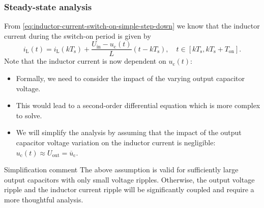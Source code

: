 \begin{frame}
    \frametitle{Steady-state analysis}
    From \eqref{eq:inductor-current-switch-on-simple-step-down} we know that the inductor current during the switch-on period is given by
    \begin{equation*}
        i_\mathrm{L}(t) = i_\mathrm{L}(k T_\mathrm{s}) + \frac{U_\mathrm{in}-u_\mathrm{c}(t)}{L} (t - k T_\mathrm{s}), \quad t\in [k T_\mathrm{s}, k T_\mathrm{s} + T_\mathrm{on}]. 
    \end{equation*}
   Note that the inductor current is now dependent on $u_\mathrm{c}(t)$:
    \begin{itemize}
        \item Formally, we need to consider the impact of the varying output capacitor voltage.
        \item This would lead to a second-order differential equation which is more complex to solve.
        \item We will simplify the analysis by assuming that the impact of the output capacitor voltage variation on the inductor current is negligible: $u_\mathrm{c}(t) \approx U_\mathrm{out}=\overline{u}_\mathrm{c}$.
    \end{itemize} 
    \vspace{-0.5cm}
    \begin{varblock}{Simplification comment}
        The above assumption is valid for sufficiently large output capacitors with only small voltage ripples. Otherwise, the output voltage ripple and the inductor current ripple will be significantly coupled and require a more thoughtful analysis.
    \end{varblock}
\end{frame}

